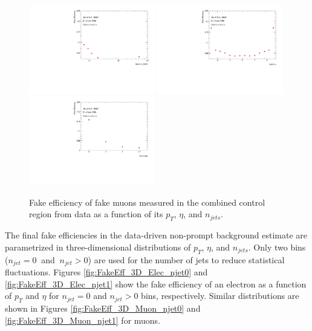 \begin{figure}[!htb]
        \begin{center}
        \includegraphics[width = 0.49\textwidth]{figures/Analysis/Background/Fake_Eff_Muon_pt_1D.pdf}
        \includegraphics[width = 0.49\textwidth]{figures/Analysis/Background/Fake_Eff_Muon_eta_1D.pdf} \\
        \includegraphics[width = 0.49\textwidth]{figures/Analysis/Background/Fake_Eff_Muon_jet_n_1D.pdf} 
        \end{center}
    \caption{Fake efficiency of fake muons measured in the combined control region from data as a function of its $p_{T}$, $\eta$, and $n_{jets}$. \label{fig:FakeEff_1D_Muon}}
\end{figure}

The final fake efficiencies in the data-driven non-prompt background estimate are parametrized in three-dimensional distributions of $p_{T}$, $\eta$, and $n_{jets}$. Only two bins ($n_{jet}=0 ~$ and $~ n_{jet} > 0$) are used for the number of jets to reduce statistical fluctuations. Figures \ref{fig:FakeEff_3D_Elec_njet0} and \ref{fig:FakeEff_3D_Elec_njet1} show the fake efficiency of an electron as a function of $p_{T}$ and $\eta$ for $n_{jet}=0 $ and $n_{jet}>0 $ bins, respectively. Similar distributions are shown in Figures \ref{fig:FakeEff_3D_Muon_njet0} and \ref{fig:FakeEff_3D_Muon_njet1} for muons.  

